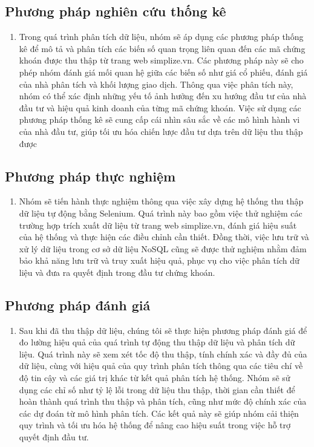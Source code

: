 \subsection{Phương pháp nghiên cứu thống kê}
\begin{enumerate}
    \item []
    \hspace*{0.7cm}Trong quá trình phân tích dữ liệu, nhóm sẽ áp dụng các phương pháp thống kê để mô tả và phân tích các biến số quan trọng liên quan đến các mã chứng khoán được thu thập từ trang web simplize.vn. Các phương pháp này sẽ cho phép nhóm đánh giá mối quan hệ giữa các biến số như giá cổ phiếu, đánh giá của nhà phân tích và khối lượng giao dịch. Thông qua việc phân tích này, nhóm có thể xác định những yếu tố ảnh hưởng đến xu hướng đầu tư của nhà đầu tư và hiệu quả kinh doanh của từng mã chứng khoán. Việc sử dụng các phương pháp thống kê sẽ cung cấp cái nhìn sâu sắc về các mô hình hành vi của nhà đầu tư, giúp tối ưu hóa chiến lược đầu tư dựa trên dữ liệu thu thập được
\end{enumerate}

\subsection{Phương pháp thực nghiệm}
\begin{enumerate}
    \item []
    \hspace*{0.7cm}Nhóm sẽ tiến hành thực nghiệm thông qua việc xây dựng hệ thống thu thập dữ liệu tự động bằng Selenium. Quá trình này bao gồm việc thử nghiệm các trường hợp trích xuất dữ liệu từ trang web simplize.vn, đánh giá hiệu suất của hệ thống và thực hiện các điều chỉnh cần thiết. Đồng thời, việc lưu trữ và xử lý dữ liệu trong cơ sở dữ liệu NoSQL cũng sẽ được thử nghiệm nhằm đảm bảo khả năng lưu trữ và truy xuất hiệu quả, phục vụ cho việc phân tích dữ liệu và đưa ra quyết định trong đầu tư chứng khoán.
\end{enumerate}

\subsection{Phương pháp đánh giá}
\begin{enumerate}
    \item []
    \hspace*{0.7cm}Sau khi đã thu thập dữ liệu, chúng tôi sẽ thực hiện phương pháp đánh giá để đo lường hiệu quả của quá trình tự động thu thập dữ liệu và phân tích dữ liệu. Quá trình này sẽ xem xét tốc độ thu thập, tính chính xác và đầy đủ của dữ liệu, cùng với hiệu quả của quy trình phân tích thông qua các tiêu chí về độ tin cậy và các giá trị khác từ kết quả phân tích hệ thống. Nhóm sẽ sử dụng các chỉ số như tỷ lệ lỗi trong dữ liệu thu thập, thời gian cần thiết để hoàn thành quá trình thu thập và phân tích, cũng như mức độ chính xác của các dự đoán từ mô hình phân tích. Các kết quả này sẽ giúp nhóm cải thiện quy trình và tối ưu hóa hệ thống để nâng cao hiệu suất trong việc hỗ trợ quyết định đầu tư.

\end{enumerate}